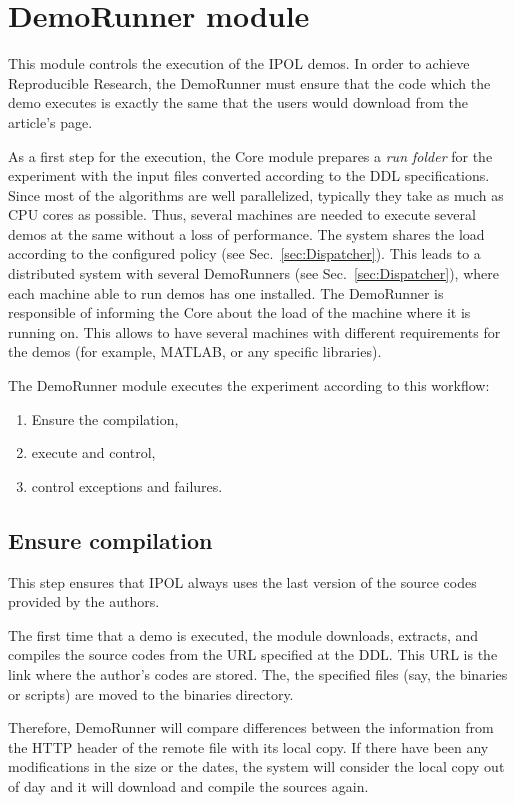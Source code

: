 \section{DemoRunner module}
\label{sec:DemoRunner}
This module controls the execution of the IPOL demos. In order to achieve Reproducible Research, the DemoRunner must ensure that the code which the demo executes is exactly the same that the users would download from the article's page.

As a first step for the execution, the Core module prepares a \emph{run folder} for the experiment with the input files converted according to the DDL specifications. Since most of the algorithms are well parallelized, typically they take as much as CPU cores as possible. Thus, several machines are needed to execute several demos at the same without a loss of performance. The system shares the load according to the configured policy (see Sec.~\ref{sec:Dispatcher}). This leads to a distributed system with several DemoRunners (see Sec.~\ref{sec:Dispatcher}), where each machine able to run demos has one installed. The DemoRunner is responsible of informing the Core about the load of the machine where it is running on. This allows to have several machines with different requirements for the demos (for example, MATLAB, or any specific libraries).

The DemoRunner module executes the experiment according to this workflow:

\begin{enumerate}
    \item Ensure the compilation,
    \item execute and control,
    \item control exceptions and failures. 
\end{enumerate}

\subsection{Ensure compilation}
\noindent

This step ensures that IPOL always uses the last version of the source codes provided by the authors. 

The first time that a demo is executed, the module downloads, extracts, and compiles the source codes from the URL specified at the DDL. This URL is the link where the author's codes are stored. The, the specified files (say, the binaries or scripts) are moved to the binaries directory.

Therefore, DemoRunner will compare differences between the information from the HTTP header of the remote file with its local copy. If there have been any modifications in the size or the dates, the system will consider the local copy out of day and it will download and compile the sources again. 


